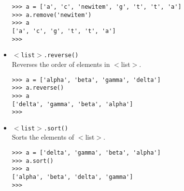 \begin{itemize}
\begin{lstlisting}
>>> a = ['a', 'c', 'newitem', 'g', 't', 't', 'a']
>>> a.remove('newitem')
>>> a
['a', 'c', 'g', 't', 't', 'a']
>>>
\end{lstlisting}
	\item 
\texttt{$<$list$>$.reverse()}
\\ Reverses the order of     elements in $<$list$>$.      
\begin{lstlisting}
>>> a = ['alpha', 'beta', 'gamma', 'delta']
>>> a.reverse()
>>> a
['delta', 'gamma', 'beta', 'alpha']
>>>
\end{lstlisting}
	\item 
\texttt{$<$list$>$.sort()}
\\ Sorts the elements of     $<$list$>$.      
\begin{lstlisting}
>>> a = ['delta', 'gamma', 'beta', 'alpha']
>>> a.sort()
>>> a
['alpha', 'beta', 'delta', 'gamma']
>>>
\end{lstlisting}
\end{itemize}
% 
% 
% 
% 
% 
% 
% 
% 
% 		
% 
% 		
% 


